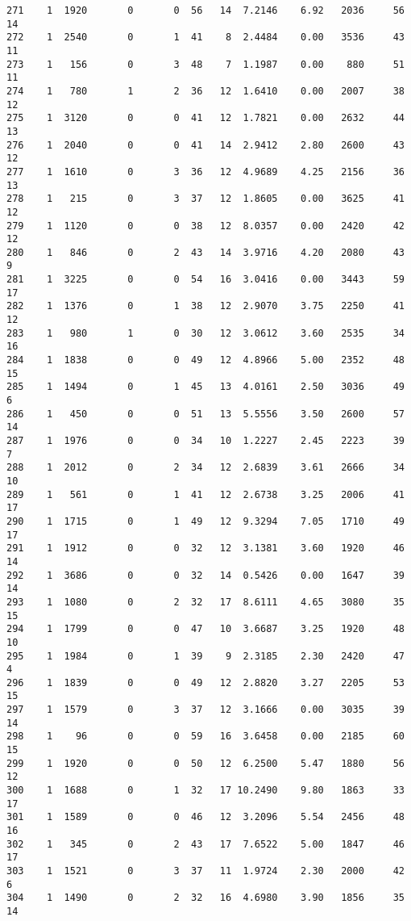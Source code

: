 \documentclass[
  letterpaper,
  DIV=11,
  numbers=noendperiod]{scrreprt}
\begin{document}
\begin{verbatim}
271    1  1920       0       0  56   14  7.2146    6.92   2036     56      14
272    1  2540       0       1  41    8  2.4484    0.00   3536     43      11
273    1   156       0       3  48    7  1.1987    0.00    880     51      11
274    1   780       1       2  36   12  1.6410    0.00   2007     38      12
275    1  3120       0       0  41   12  1.7821    0.00   2632     44      13
276    1  2040       0       0  41   14  2.9412    2.80   2600     43      12
277    1  1610       0       3  36   12  4.9689    4.25   2156     36      13
278    1   215       0       3  37   12  1.8605    0.00   3625     41      12
279    1  1120       0       0  38   12  8.0357    0.00   2420     42      12
280    1   846       0       2  43   14  3.9716    4.20   2080     43       9
281    1  3225       0       0  54   16  3.0416    0.00   3443     59      17
282    1  1376       0       1  38   12  2.9070    3.75   2250     41      12
283    1   980       1       0  30   12  3.0612    3.60   2535     34      16
284    1  1838       0       0  49   12  4.8966    5.00   2352     48      15
285    1  1494       0       1  45   13  4.0161    2.50   3036     49       6
286    1   450       0       0  51   13  5.5556    3.50   2600     57      14
287    1  1976       0       0  34   10  1.2227    2.45   2223     39       7
288    1  2012       0       2  34   12  2.6839    3.61   2666     34      10
289    1   561       0       1  41   12  2.6738    3.25   2006     41      17
290    1  1715       0       1  49   12  9.3294    7.05   1710     49      17
291    1  1912       0       0  32   12  3.1381    3.60   1920     46      14
292    1  3686       0       0  32   14  0.5426    0.00   1647     39      14
293    1  1080       0       2  32   17  8.6111    4.65   3080     35      15
294    1  1799       0       0  47   10  3.6687    3.25   1920     48      10
295    1  1984       0       1  39    9  2.3185    2.30   2420     47       4
296    1  1839       0       0  49   12  2.8820    3.27   2205     53      15
297    1  1579       0       3  37   12  3.1666    0.00   3035     39      14
298    1    96       0       0  59   16  3.6458    0.00   2185     60      15
299    1  1920       0       0  50   12  6.2500    5.47   1880     56      12
300    1  1688       0       1  32   17 10.2490    9.80   1863     33      17
301    1  1589       0       0  46   12  3.2096    5.54   2456     48      16
302    1   345       0       2  43   17  7.6522    5.00   1847     46      17
303    1  1521       0       3  37   11  1.9724    2.30   2000     42       6
304    1  1490       0       2  32   16  4.6980    3.90   1856     35      14

\end{verbatim}
\end{document}
